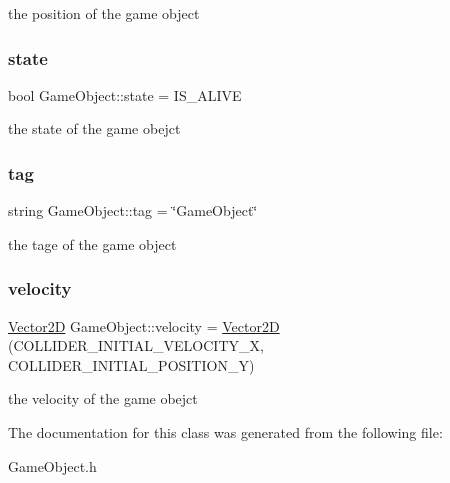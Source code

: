 the position of the game object \mbox{\label{class_game_object_a18605215a43917ea9f761e82da0fd44c}} 
\subsubsection{\texorpdfstring{state}{state}}
{\footnotesize\ttfamily bool Game\+Object\+::state = I\+S\+\_\+\+A\+L\+I\+VE\hspace{0.3cm}{\ttfamily [protected]}}

the state of the game obejct \mbox{\label{class_game_object_af3e560c598ca121eb9190a8d10ab42ae}} 
\subsubsection{\texorpdfstring{tag}{tag}}
{\footnotesize\ttfamily string Game\+Object\+::tag = \char`\"{}Game\+Object\char`\"{}\hspace{0.3cm}{\ttfamily [protected]}}

the tage of the game object \mbox{\label{class_game_object_a80879281f771f2621c6726fa2db7e7cb}} 
\subsubsection{\texorpdfstring{velocity}{velocity}}
{\footnotesize\ttfamily \mbox{\hyperlink{struct_vector2_d}{Vector2D}} Game\+Object\+::velocity = \mbox{\hyperlink{struct_vector2_d}{Vector2D}} (C\+O\+L\+L\+I\+D\+E\+R\+\_\+\+I\+N\+I\+T\+I\+A\+L\+\_\+\+V\+E\+L\+O\+C\+I\+T\+Y\+\_\+X, C\+O\+L\+L\+I\+D\+E\+R\+\_\+\+I\+N\+I\+T\+I\+A\+L\+\_\+\+P\+O\+S\+I\+T\+I\+O\+N\+\_\+Y)\hspace{0.3cm}{\ttfamily [protected]}}

the velocity of the game obejct 

The documentation for this class was generated from the following file\+:\begin{DoxyCompactItemize}
\item 
Game\+Object.\+h\end{DoxyCompactItemize}
